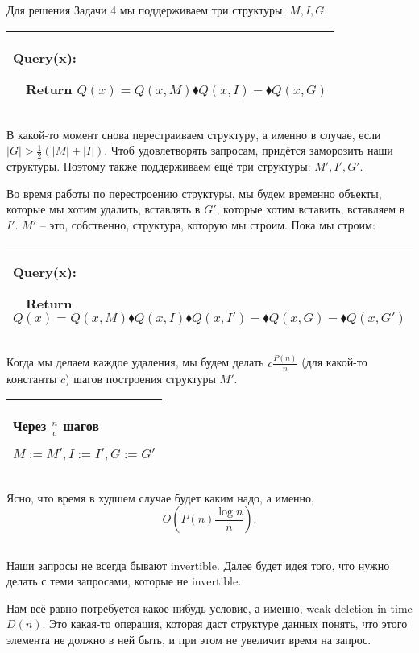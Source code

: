 Для решения Задачи 4 мы поддерживаем три структуры: $M,I,G$:

\begin{tabular}{|p{8cm}|}
\hline
Query(x):

$\quad$Return $Q(x)=Q(x,M)\blacklozenge Q(x,I)-\blacklozenge Q(x,G)$\\
\hline
\end{tabular}


В какой-то момент снова перестраиваем структуру, а именно в случае, если $|G|>\frac{1}{2}(|M|+|I|)$. Чтоб удовлетворять запросам, придётся заморозить наши структуры. Поэтому также поддерживаем ещё три структуры: $M',I',G'$.

Во время работы по перестроению структуры, мы будем временно объекты, которые мы хотим удалить, вставлять в $G'$, которые хотим вставить, вставляем в $I'$. $M'$ -- это, собственно, структура, которую мы строим. Пока мы строим:

\begin{tabular}{|p{11cm}|}
\hline
Query(x):

$\quad$Return $Q(x)=Q(x,M)\blacklozenge Q(x,I) \blacklozenge Q(x,I')-\blacklozenge Q(x,G)-\blacklozenge Q(x,G')$\\
\hline
\end{tabular}


Когда мы делаем каждое удаления, мы будем делать $c\frac{P(n)}{n}$ (для какой-то константы $c$) шагов построения структуры $M'$.

\begin{tabular}{|p{4cm}|}
\hline
Через $\frac{n}{c}$ шагов

$M:=M',I:=I',G:=G'$\\
\hline
\end{tabular}


Ясно, что время в худшем случае будет каким надо, а именно,
$$O\left(P(n)\frac{\log n}{n} \right).$$

\subsection{}

Наши запросы не всегда бывают invertible. Далее будет идея того, что нужно делать с теми запросами, которые не invertible.

Нам всё равно потребуется какое-нибудь условие, а именно, weak deletion in time $D(n)$. Это какая-то операция, которая даст структуре данных понять, что этого элемента не должно в ней быть, и при этом не увеличит время на запрос.

